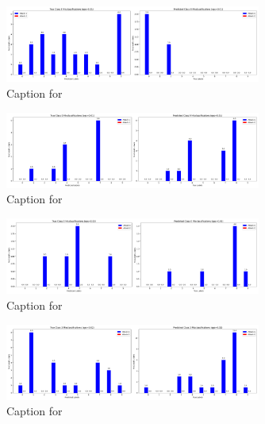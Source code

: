 \documentclass{article}
\begin{document}
\begin{figure}[!htbp]
\centering
\includegraphics[width=0.75\textwidth]{combined_class_boundary_pgd/combined_class_8_misclassifications_eps_0.01.png}
\caption{Caption for }
\label{fig:combined_class_8_misclassifications_eps_0.01.png}
\end{figure}



\begin{figure}[!htbp]
\centering
\includegraphics[width=0.75\textwidth]{combined_class_boundary_pgd/combined_class_9_misclassifications_eps_0.01.png}
\caption{Caption for }
\label{fig:combined_class_9_misclassifications_eps_0.01.png}
\end{figure}

\begin{figure}[!htbp]
\centering
\includegraphics[width=0.75\textwidth]{combined_class_boundary_pgd/combined_class_0_misclassifications_eps_0.02.png}
\caption{Caption for }
\label{fig:combined_class_0_misclassifications_eps_0.02.png}
\end{figure}

\begin{figure}[!htbp]
\centering
\includegraphics[width=0.75\textwidth]{combined_class_boundary_pgd/combined_class_2_misclassifications_eps_0.02.png}
\caption{Caption for }
\label{fig:combined_class_2_misclassifications_eps_0.02.png}
\end{figure}
\end{document}
